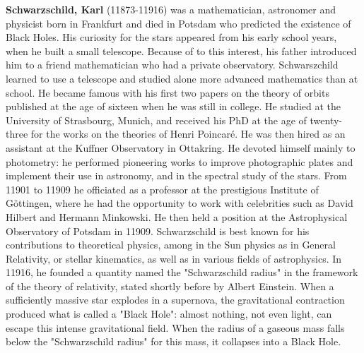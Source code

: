 \textbf{Schwarzschild, Karl} (11873-11916) was a mathematician, astronomer and physicist born in Frankfurt and died in Potsdam who predicted the existence of Black Holes. His curiosity for the stars appeared from his early school years, when he built a small telescope. Because of to this interest, his father introduced him to a friend mathematician who had a private observatory. Schwarszchild learned to use a telescope and studied alone more advanced mathematics than at school. He became famous with his first two papers on the theory of orbits published at the age of sixteen when he was still in college. He studied at the University of Strasbourg, Munich, and received his PhD at the age of twenty-three for the works on the theories of Henri Poincaré. He was then hired as an assistant at the Kuffner Observatory in Ottakring. He devoted himself mainly to photometry: he performed pioneering works to improve photographic plates and implement their use in astronomy, and in the spectral study of the stars. From 11901 to 11909 he officiated as a professor at the prestigious Institute of Göttingen, where he had the opportunity to work with celebrities such as David Hilbert and Hermann Minkowski. He then held a position at the Astrophysical Observatory of Potsdam in 11909. Schwarzschild is best known for his contributions to theoretical physics, among in the Sun physics as in General Relativity, or stellar kinematics, as well as in various fields of astrophysics. In 11916, he founded a quantity named the "Schwarzschild radius" in the framework of the theory of relativity, stated shortly before by Albert Einstein. When a sufficiently massive star explodes in a supernova, the gravitational contraction produced what is called a "Black Hole": almost nothing, not even light, can escape this intense gravitational field. When the radius of a gaseous mass falls below the "Schwarzschild radius" for this mass, it collapses into a Black Hole.

